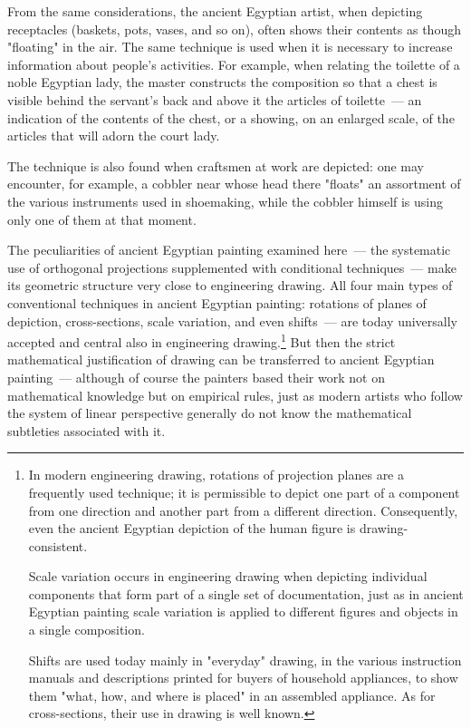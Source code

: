
From the same considerations, the ancient Egyptian artist, when depicting receptacles
(baskets, pots, vases, and so on), often shows their contents as though "floating" in the
air. The same technique is used when it is necessary to increase information about
people's activities. For example, when relating the toilette of a noble Egyptian lady, the
master constructs the composition so that a chest is visible behind the servant's back
and above it the articles of toilette~--- an indication of the contents of the chest, or a
showing, on an enlarged scale, of the articles that will adorn the court lady.

The technique is also found when craftsmen at work are depicted: one may encounter,
for example, a cobbler near whose head there "floats" an assortment of the various
instruments used in shoemaking, while the cobbler himself is using only one of them at
that moment.



The peculiarities of ancient Egyptian painting examined here~--- the systematic use of
orthogonal projections supplemented with conditional techniques~--- make its geometric
structure very close to engineering drawing. All four main types of conventional
techniques in ancient Egyptian painting: rotations of planes of depiction, cross-sections,
scale variation, and even shifts~--- are today universally accepted and central also in
engineering drawing.\footnote{%
  In modern engineering drawing, rotations of projection planes are a frequently used
  technique; it is permissible to depict one part of a component from one direction and
  another part from a different direction. Consequently, even the ancient Egyptian
  depiction of the human figure is drawing-consistent.
  \par Scale variation occurs in engineering drawing when depicting individual
  components that form part of a single set of documentation, just as in ancient
  Egyptian painting scale variation is applied to different figures and objects in a single
  composition.
  \par Shifts are used today mainly in "everyday" drawing, in the various instruction
  manuals and descriptions printed for buyers of household appliances, to show them
  "what, how, and where is placed" in an assembled appliance. As for cross-sections,
  their use in drawing is well known.}
But then the strict mathematical justification of drawing can be transferred to ancient
Egyptian painting~--- although of course the painters based their work not on
mathematical knowledge but on empirical rules, just as modern artists who follow the
system of linear perspective generally do not know the mathematical subtleties
associated with it.

